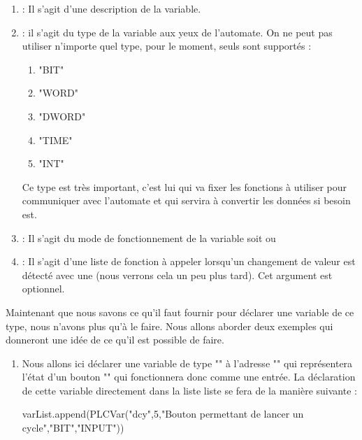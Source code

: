 {\begin{enumerate}
\item {} : Il s'agit d'une description de la variable.

\item {} : il s'agit du type de la variable aux yeux de l'automate. On ne peut pas utiliser n'importe quel type, pour le moment, seuls sont supportés : 

\begin{enumerate}
    \item "BIT"
    \item "WORD"
    \item "DWORD"
    \item "TIME"
    \item "INT"
\end{enumerate}

Ce type est très important, c'est lui qui va fixer les fonctions à utiliser pour communiquer avec l'automate et qui servira à convertir les données si besoin est.

\item {} : Il s'agit du mode de fonctionnement de la variable soit  ou 

\item {} : Il s'agit d'une liste de fonction à appeler lorsqu'un changement de valeur est détecté avec une  (nous verrons cela un peu plus tard). Cet argument est optionnel.
\end{enumerate}


Maintenant que nous savons ce qu'il faut fournir pour déclarer une variable de ce type, nous n'avons plus qu'à le faire. Nous allons aborder deux exemples qui donneront une idée de ce qu'il est possible de faire.

\begin{enumerate}


\item {}\newline
Nous allons ici déclarer une variable de type "" à l'adresse "" qui représentera l'état d'un bouton "" qui fonctionnera donc comme une entrée.\newline
La déclaration de cette variable directement dans la liste liste  se fera de la manière suivante :
\begin{Python}
varList.append(PLCVar("dcy",5,"Bouton permettant de lancer un cycle","BIT","INPUT"))
\end{Python}


\end{enumerate}}
